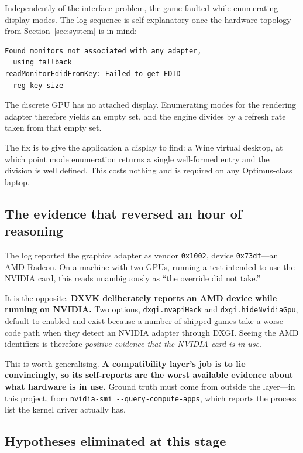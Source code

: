 Independently of the interface problem, the game faulted while enumerating
display modes. The log sequence is self-explanatory once the hardware topology
from Section~\ref{sec:system} is in mind:

\begin{lstlisting}
Found monitors not associated with any adapter,
  using fallback
readMonitorEdidFromKey: Failed to get EDID
  reg key size
\end{lstlisting}

The discrete GPU has no attached display. Enumerating modes for the rendering
adapter therefore yields an empty set, and the engine divides by a refresh rate
taken from that empty set.

The fix is to give the application a display to find: a Wine virtual desktop, at
which point mode enumeration returns a single well-formed entry and the division
is well defined. This costs nothing and is required on any Optimus-class laptop.

\subsection{The evidence that reversed an hour of reasoning}

The log reported the graphics adapter as vendor \verb|0x1002|, device
\verb|0x73df|---an AMD Radeon. On a machine with two GPUs, running a test
intended to use the NVIDIA card, this reads unambiguously as ``the override did
not take.''

It is the opposite. \textbf{DXVK deliberately reports an AMD device while
running on NVIDIA.} Two options, \verb|dxgi.nvapiHack| and
\verb|dxgi.hideNvidiaGpu|, default to enabled and exist because a number of
shipped games take a worse code path when they detect an NVIDIA adapter through
DXGI. Seeing the AMD identifiers is therefore \emph{positive evidence that the
NVIDIA card is in use}.

This is worth generalising. \textbf{A compatibility layer's job is to lie
convincingly, so its self-reports are the worst available evidence about what
hardware is in use.} Ground truth must come from outside the layer---in this
project, from \verb|nvidia-smi --query-compute-apps|, which reports the process
list the kernel driver actually has.

\subsection{Hypotheses eliminated at this stage}

